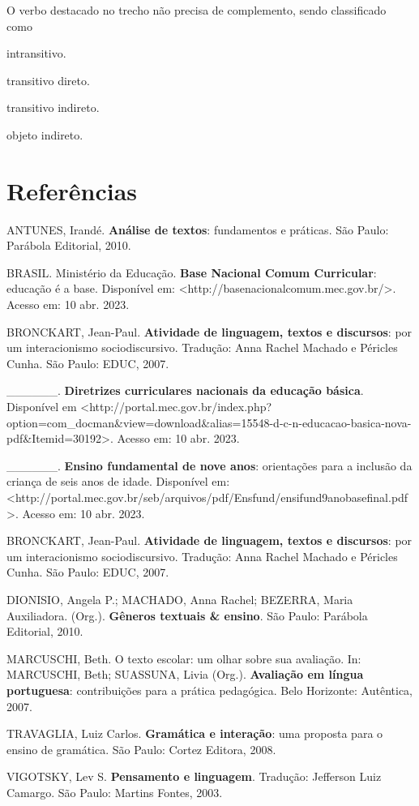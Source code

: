 O verbo destacado no trecho não precisa de complemento, sendo
classificado como

\begin{escolha}
\item intransitivo.

\item transitivo direto.

\item transitivo indireto.

\item objeto indireto.
\end{escolha}



\chapter{Referências}

ANTUNES, Irandé. \textbf{Análise de textos}: fundamentos e práticas. São
Paulo: Parábola Editorial, 2010.

BRASIL. Ministério da Educação. \textbf{Base Nacional Comum Curricular}:
educação é a base. Disponível em:
\textless{}http://basenacionalcomum.mec.gov.br/\textgreater{}. Acesso
em: 10 abr. 2023.

BRONCKART, Jean-Paul. \textbf{Atividade de linguagem, textos e
discursos}: por um interacionismo sociodiscursivo. Tradução: Anna Rachel
Machado e Péricles Cunha. São Paulo: EDUC, 2007.

\_\_\_\_\_\_. \textbf{Diretrizes curriculares nacionais da educação
básica}. Disponível em
\textless{}http://portal.mec.gov.br/index.php?option=com\_docman\&view=download\&alias=15548-d-c-n-educacao-basica-nova-pdf\&Itemid=30192\textgreater{}.
Acesso em: 10 abr. 2023.

\_\_\_\_\_\_. \textbf{Ensino fundamental de nove anos}: orientações para
a inclusão da criança de seis anos de idade. Disponível em:
\textless{}http://portal.mec.gov.br/seb/arquivos/pdf/Ensfund/ensifund9anobasefinal.pdf\textgreater{}.
Acesso em: 10 abr. 2023.

BRONCKART, Jean-Paul. \textbf{Atividade de linguagem, textos e
discursos}: por um interacionismo sociodiscursivo. Tradução: Anna Rachel
Machado e Péricles Cunha. São Paulo: EDUC, 2007.

DIONISIO, Angela P.; MACHADO, Anna Rachel; BEZERRA, Maria Auxiliadora.
(Org.). \textbf{Gêneros textuais \& ensino}. São Paulo: Parábola
Editorial, 2010.

MARCUSCHI, Beth. O texto escolar: um olhar sobre sua avaliação. In:
MARCUSCHI, Beth; SUASSUNA, Livia (Org.). \textbf{Avaliação em língua
portuguesa}: contribuições para a prática pedagógica. Belo Horizonte:
Autêntica, 2007.

TRAVAGLIA, Luiz Carlos. \textbf{Gramática e interação}: uma proposta
para o ensino de gramática. São Paulo: Cortez Editora, 2008.

VIGOTSKY, Lev S. \textbf{Pensamento e linguagem}. Tradução: Jefferson
Luiz Camargo. São Paulo: Martins Fontes, 2003.
